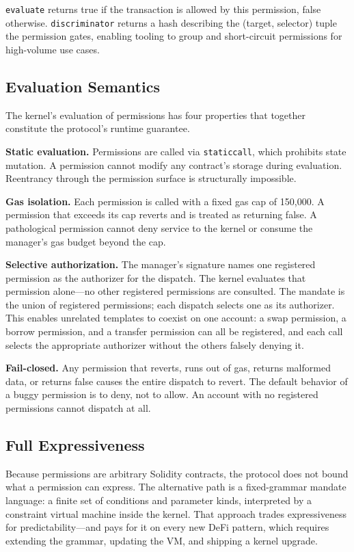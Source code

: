 \documentclass[11pt]{article}
\begin{document}
\texttt{evaluate} returns true if the transaction is allowed by this permission, false otherwise. \texttt{discriminator} returns a hash describing the (target, selector) tuple the permission gates, enabling tooling to group and short-circuit permissions for high-volume use cases.

\subsection{Evaluation Semantics}

The kernel's evaluation of permissions has four properties that together constitute the protocol's runtime guarantee.

\textbf{Static evaluation.} Permissions are called via \texttt{staticcall}, which prohibits state mutation. A permission cannot modify any contract's storage during evaluation. Reentrancy through the permission surface is structurally impossible.

\textbf{Gas isolation.} Each permission is called with a fixed gas cap of 150{,}000. A permission that exceeds its cap reverts and is treated as returning false. A pathological permission cannot deny service to the kernel or consume the manager's gas budget beyond the cap.

\textbf{Selective authorization.} The manager's signature names one registered permission as the authorizer for the dispatch. The kernel evaluates that permission alone---no other registered permissions are consulted. The mandate is the union of registered permissions; each dispatch selects one as its authorizer. This enables unrelated templates to coexist on one account: a swap permission, a borrow permission, and a transfer permission can all be registered, and each call selects the appropriate authorizer without the others falsely denying it.

\textbf{Fail-closed.} Any permission that reverts, runs out of gas, returns malformed data, or returns false causes the entire dispatch to revert. The default behavior of a buggy permission is to deny, not to allow. An account with no registered permissions cannot dispatch at all.

\subsection{Full Expressiveness}

Because permissions are arbitrary Solidity contracts, the protocol does not bound what a permission can express. The alternative path is a fixed-grammar mandate language: a finite set of conditions and parameter kinds, interpreted by a constraint virtual machine inside the kernel. That approach trades expressiveness for predictability---and pays for it on every new DeFi pattern, which requires extending the grammar, updating the VM, and shipping a kernel upgrade.
\end{document}
